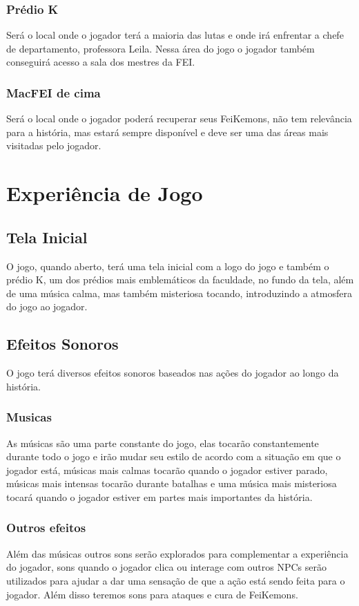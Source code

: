 \documentclass[a4paper,12pt]{article}
\begin{document}
\subsubsection{Prédio K}
Será o local onde o jogador terá a maioria das lutas e onde irá enfrentar a chefe de departamento, professora Leila.
Nessa área do jogo o jogador também conseguirá acesso a sala dos mestres da FEI.

\subsubsection{MacFEI de cima}
Será o local onde o jogador poderá recuperar seus FeiKemons, não tem relevância para a história, mas estará sempre disponível
e deve ser uma das áreas mais visitadas pelo jogador.

\newpage
\section{Experiência de Jogo}
\subsection{Tela Inicial}
O jogo, quando aberto, terá uma tela inicial com a logo do jogo e também o prédio K, um dos prédios mais emblemáticos da faculdade,
no fundo da tela, além de uma música calma, mas também misteriosa tocando, introduzindo a atmosfera do jogo ao jogador.

\subsection{Efeitos Sonoros}
O jogo terá diversos efeitos sonoros baseados nas ações do jogador ao longo da história.

\subsubsection{Musicas}
As músicas são uma parte constante do jogo, elas tocarão constantemente durante todo o jogo e irão mudar seu estilo de acordo
com a situação em que o jogador está, músicas mais calmas tocarão quando o jogador estiver parado, músicas mais intensas tocarão durante batalhas e
uma música mais misteriosa tocará quando o jogador estiver em partes mais importantes da história.

\subsubsection{Outros efeitos}
Além das músicas outros sons serão explorados para complementar a experiência do jogador, sons quando o jogador clica ou interage
com outros NPCs serão utilizados para ajudar a dar uma sensação de que a ação está sendo feita para o jogador. Além disso teremos sons
para ataques e cura de FeiKemons.
\end{document}

